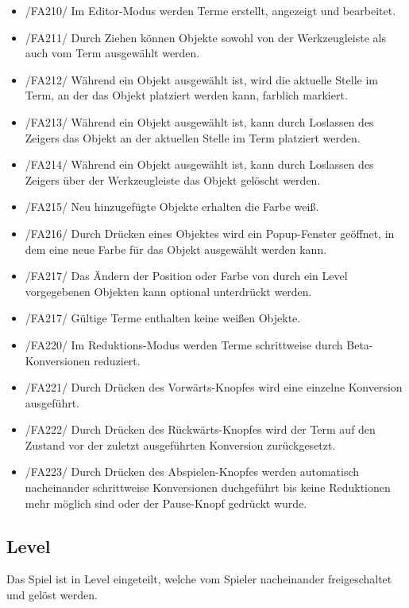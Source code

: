 \begin{itemize}
\item /FA210/ Im Editor-Modus werden Terme erstellt, angezeigt und bearbeitet.
\item /FA211/ Durch Ziehen können Objekte sowohl von der Werkzeugleiste als auch vom Term ausgewählt werden.
\item /FA212/ Während ein Objekt ausgewählt ist, wird die aktuelle Stelle im Term, an der das Objekt platziert werden kann, farblich markiert.
\item /FA213/ Während ein Objekt ausgewählt ist, kann durch Loslassen des Zeigers das Objekt an der aktuellen Stelle im Term platziert werden.
\item /FA214/ Während ein Objekt ausgewählt ist, kann durch Loslassen des Zeigers über der Werkzeugleiste das Objekt gelöscht werden.
\item /FA215/ Neu hinzugefügte Objekte erhalten die Farbe weiß.
\item /FA216/ Durch Drücken eines Objektes wird ein Popup-Fenster geöffnet, in dem eine neue Farbe für das Objekt ausgewählt werden kann.
\item /FA217/ Das Ändern der Position oder Farbe von durch ein Level vorgegebenen Objekten kann optional unterdrückt werden.
\item /FA217/ Gültige Terme enthalten keine weißen Objekte.
\end{itemize}

\begin{itemize}
\item /FA220/ Im Reduktions-Modus werden Terme schrittweise durch Beta-Konversionen reduziert.
\item /FA221/ Durch Drücken des Vorwärts-Knopfes wird eine einzelne Konversion ausgeführt.
\item /FA222/ Durch Drücken des Rückwärts-Knopfes wird der Term auf den Zustand vor der zuletzt ausgeführten Konversion zurückgesetzt.
\item /FA223/ Durch Drücken des Abspielen-Knopfes werden automatisch nacheinander schrittweise Konversionen duchgeführt bis keine Reduktionen mehr möglich sind oder der Pause-Knopf gedrückt wurde.
\end{itemize}

\subsection{Level}

Das Spiel ist in Level eingeteilt, welche vom Spieler nacheinander freigeschaltet und gelöst werden.

